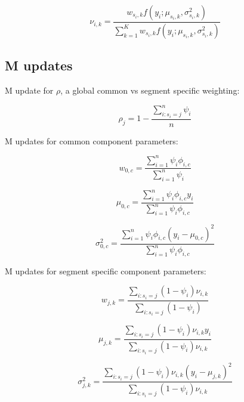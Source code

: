 \documentclass[11pt,a4paper]{article}
\begin{document}
$$
	\nu_{i,k} = \frac{ w_{s_i,k} f(y_i;\mu_{s_i,k}, \sigma_{s_i,k}^2 ) }
					{ \sum_{k=1}^{K} w_{s_i,k} f(y_i;\mu_{s_i,k}, \sigma_{s_i,k}^2 ) }  
$$

\subsection{M updates}

\noindent M update for $\rho$, a global common vs segment specific weighting:

$$
	\rho_{j} = 1 - \frac{ \sum_{i : s_i = j}^n \psi_i }{ n }
$$

\noindent M updates for common component parameters:

$$
	w_{0,c} = \frac{ \sum_{i=1}^n \psi_i \phi_{i,c} }
    				{ \sum_{i=1}^n \psi_i }
$$

$$
	\mu_{0,c} = \frac{ \sum_{i=1}^n \psi_i \phi_{i,c} y_i }
    				{ \sum_{i=1}^n \psi_i \phi_{i,c} }
$$

$$
	\sigma_{0,c}^2 = \frac{ \sum_{i=1}^n \psi_i \phi_{i,c} ( y_i - \mu_{0,c} )^2 }
    					{ \sum_{i=1}^n \psi_i \phi_{i,c} }
$$

\noindent M updates for segment specific component parameters:

$$
	w_{j,k} = \frac{ \sum_{i : s_i = j } (1-\psi_i) \nu_{i,k} }
    			{ \sum_{i : s_i = j} (1-\psi_i) }
$$

$$
	\mu_{j,k} = \frac{ \sum_{i : s_i = j } (1-\psi_i) \nu_{i,k} y_i }
    				{ \sum_{i : s_i = j} (1-\psi_i) \nu_{i,k} }
$$

$$
	\sigma_{j,k}^2 = \frac{ \sum_{i : s_i = j } (1-\psi_i) \nu_{i,k} ( y_i - \mu_{j,k})^2 }
    					{ \sum_{i : s_i = j} (1-\psi_i) \nu_{i,k} }
$$
\end{document}
